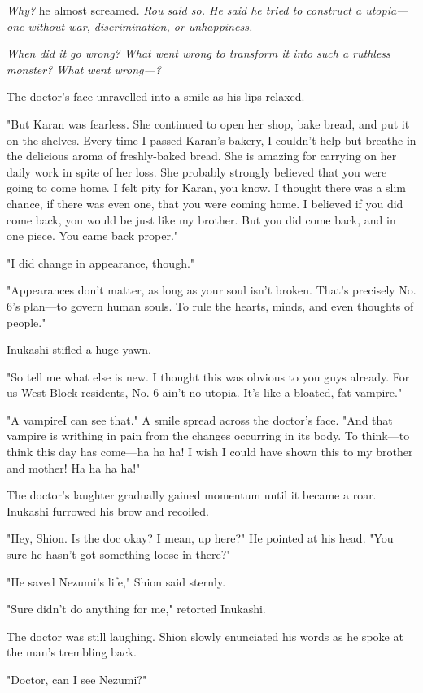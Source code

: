 \emph{Why?} he almost screamed. \emph{Rou said so. He said he tried to construct a
utopia---one without war, discrimination, or unhappiness.}

\emph{When did it go wrong? What went wrong to transform it into such a
ruthless monster? What went wrong---?}

The doctor's face unravelled into a smile as his lips relaxed.

"But Karan was fearless. She continued to open her shop, bake bread, and
put it on the shelves. Every time I passed Karan's bakery, I couldn't
help but breathe in the delicious aroma of freshly-baked bread. She is
amazing for carrying on her daily work in spite of her loss. She
probably strongly believed that you were going to come home. I felt pity
for Karan, you know. I thought there was a slim chance, if there was
even one, that you were coming home. I believed if you did come back,
you would be just like my brother. But you did come back, and in one
piece. You came back proper."

"I did change in appearance, though."

"Appearances don't matter, as long as your soul isn't broken. That's
precisely No. 6's plan---to govern human souls. To rule the hearts, minds,
and even thoughts of people."

Inukashi stifled a huge yawn.

"So tell me what else is new. I thought this was obvious to you guys
already. For us West Block residents, No. 6 ain't no utopia. It's like a
bloated, fat vampire."

"A vampire\el I can see that." A smile spread across the doctor's face.
"And that vampire is writhing in pain from the changes occurring in its
body. To think---to think this day has come---ha ha ha! I wish I could have
shown this to my brother and mother! Ha ha ha ha!"

The doctor's laughter gradually gained momentum until it became a roar.
Inukashi furrowed his brow and recoiled.

"Hey, Shion. Is the doc okay? I mean, up here?" He pointed at his head.
"You sure he hasn't got something loose in there?"

"He saved Nezumi's life," Shion said sternly.

"Sure didn't do anything for me," retorted Inukashi.

The doctor was still laughing. Shion slowly enunciated his words as he
spoke at the man's trembling back.

"Doctor, can I see Nezumi?"


